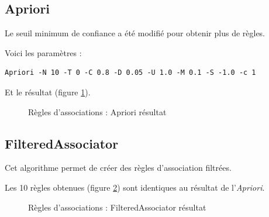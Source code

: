 \subsection{Apriori}

Le seuil minimum de confiance a été modifié pour obtenir plus de règles.

Voici les paramètres :

\begin{lstlisting}
Apriori -N 10 -T 0 -C 0.8 -D 0.05 -U 1.0 -M 0.1 -S -1.0 -c 1
\end{lstlisting}

Et le résultat (figure \ref{apriori}).

\begin{figure}[H]
    \centering
    \caption{Règles d'associations : Apriori résultat}
    \label{apriori}
\end{figure}

\subsection{FilteredAssociator}

Cet algorithme permet de créer des règles d'association filtrées.

Les 10 règles obtenues (figure \ref{filtered}) sont identiques au résultat de l'\textit{Apriori}.

\begin{figure}[H]
    \centering
    \caption{Règles d'associations : FilteredAssociator résultat}
    \label{filtered}
\end{figure}
